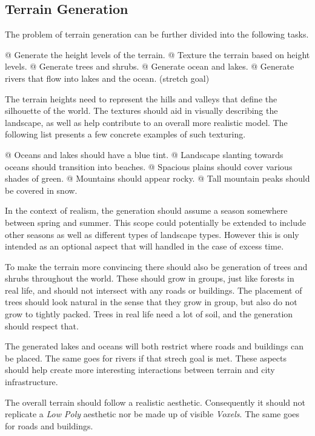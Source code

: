 \subsection{Terrain Generation}

The problem of terrain generation can be further divided into the following tasks.
\begin{easylist}
  @ Generate the height levels of the terrain.
  @ Texture the terrain based on height levels.
  @ Generate trees and shrubs.
  @ Generate ocean and lakes.
  @ Generate rivers that flow into lakes and the ocean. (stretch goal)
\end{easylist}

The terrain heights need to represent the hills and valleys that define the silhouette of the world.
The textures should aid in visually describing the landscape, as well as
help contribute to an overall more realistic model. The following list presents
a few concrete examples of such texturing.
\begin{easylist}
  @ Oceans and lakes should have a blue tint.
  @ Landscape slanting towards oceans should transition into beaches.
  @ Spacious plains should cover various shades of green.
  @ Mountains should appear rocky.
  @ Tall mountain peaks should be covered in snow.
\end{easylist}

In the context of realism, the generation should assume a season somewhere
between spring and summer.
This scope could potentially be extended to include other seasons as well as
different types of landscape types.
However this is only intended as an optional aspect that will handled in the case
of excess time.

To make the terrain more convincing there should also be generation of trees and shrubs
throughout the world. These should grow in groups, just like forests in
real life, and should not intersect with any roads or buildings.
The placement of trees should look natural in the sense that they grow in group,
but also do not grow to tightly packed.
Trees in real life need a lot of soil, and the generation should respect that.

The generated lakes and oceans will both restrict where roads and buildings can be placed.
The same goes for rivers if that strech goal is met.
These aspects should help create more interesting interactions between terrain
and city infrastructure.

The overall terrain should follow a realistic aesthetic. Consequently it should not
replicate a \textit{Low Poly} aesthetic nor be made up of visible \textit{Voxels}.
The same goes for roads and buildings.